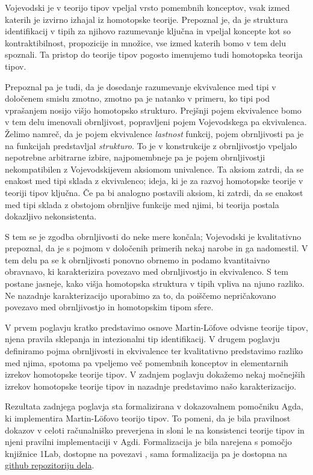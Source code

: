 Vojevodski je v teorijo tipov vpeljal vrsto pomembnih konceptov, vsak izmed katerih je izvirno izhajal iz homotopske teorije. Prepoznal je, da je struktura identifikacij v tipih za njihovo razumevanje ključna in vpeljal koncepte kot so kontraktibilnost, propozicije in množice, vse izmed katerih bomo v tem delu spoznali. Ta pristop do teorije tipov pogosto imenujemo tudi homotopska teorija tipov.

Prepoznal pa je tudi, da je dosedanje razumevanje ekvivalence med tipi v določenem smislu zmotno, zmotno pa je natanko v primeru, ko tipi pod vprašanjem nosijo višjo homotopsko strukturo. Prejšnji pojem ekvivalence bomo v tem delu imenovali obrnljivost, popravljeni pojem Vojevodskega pa ekvivalenca. Želimo namreč, da je pojem ekvivalence \emph{lastnost} funkcij, pojem obrnljivosti pa je na funkcijah predstavljal \emph{strukturo}. To je v konstrukcije z obrnljivostjo vpeljalo nepotrebne arbitrarne izbire, najpomembneje pa je pojem obrnljivostji nekompatibilen z Vojevodskijevem aksiomom univalence. Ta aksiom zatrdi, da se enakost med tipi sklada z ekvivalenco; ideja, ki je za razvoj homotopske teorije v teoriji tipov ključna. Če pa bi analogno postavili aksiom, ki zatrdi, da se enakost med tipi sklada z obstojom obrnljive funkcije med njimi, bi teorija postala dokazljivo nekonsistenta.

S tem se je zgodba obrnljivosti do neke mere končala; Vojevodski je kvalitativno prepoznal, da je s pojmom v določenih primerih nekaj narobe in ga nadomestil. V tem delu pa se k obrnljivosti ponovno obrnemo in podamo kvantitaivno obravnavo, ki karakterizira povezavo med obrnljivostjo in ekvivalenco. S tem postane jasneje, kako višja homotopska struktura v tipih vpliva na njuno razliko. Ne nazadnje karakterizacijo uporabimo za to, da poiščemo nepričakovano povezavo med obrnljivostjo in homotopskim tipom sfere.

V prvem poglavju kratko predstavimo osnove Martin-Löfove odvisne teorije tipov, njena pravila sklepanja in intezionalni tip identifikacij. V drugem poglavju definiramo pojma obrnljivosti in ekvivalence ter kvalitativno predstavimo razliko med njima, spotoma pa vpeljemo več pomembnih konceptov in elementarnih izrekov homotopske teorije tipov. V zadnjem poglavju dokažemo nekaj močnejših izrekov homotopske teorije tipov in nazadnje predstavimo našo karakterizacijo.

Rezultata zadnjega poglavja sta formalizirana v dokazovalnem pomočniku Agda, ki implementira Martin-Löfovo teorijo tipov. To pomeni, da je bila pravilnost dokazov v celoti računalniško preverjena in sloni le na konsistenci teorije tipov in njeni pravilni implementaciji v Agdi. Formalizacija je bila narejena s pomočjo knjižnice 1Lab, dostopne na povezavi \cite{1lab}, sama formalizacija pa je dostopna na \href{https://github.com/maybemabeline/invertible-maps-are-spheres-in-the-universe/blob/master/IsoSpheres/IsoSpheres.lagda.md}{github repozitoriju dela}.

